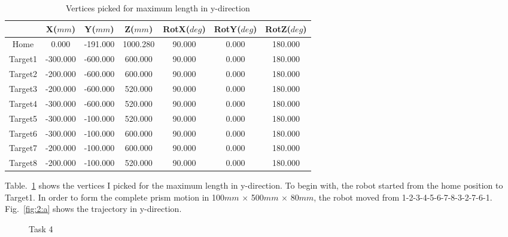 \documentclass[letterpaper,11pt]{texMemo} %
\begin{document}
\renewcommand\arraystretch{2}
\begin{table}[H]\footnotesize
\centering
\begin{tabular}{|c|c|c|c|c|c|c|}
\hline
 & \textbf{X($mm$)}&\textbf{Y($mm$)}&\textbf{Z($mm$)}& \textbf{RotX($deg$)} & \textbf{RotY($deg$)} & \textbf{RotZ($deg$)} \\
\hline
Home & 0.000 & -191.000 & 1000.280 & 90.000 & 0.000 & 180.000\\
\hline
Target1 & -300.000 & -600.000 & 600.000 & 90.000 & 0.000 & 180.000\\
\hline
Target2 & -200.000 & -600.000 & 600.000 & 90.000 & 0.000 & 180.000\\
\hline
Target3 & -200.000 & -600.000 & 520.000 & 90.000 & 0.000 & 180.000\\
\hline 
Target4 & -300.000 & -600.000 & 520.000 & 90.000 & 0.000 & 180.000\\
\hline
Target5  & -300.000 & -100.000 & 520.000 & 90.000 & 0.000 & 180.000\\
\hline
Target6  & -300.000 & -100.000 & 600.000 & 90.000 & 0.000 & 180.000\\
\hline
Target7  & -200.000 & -100.000 & 600.000 & 90.000 & 0.000 & 180.000\\
\hline
Target8  &-200.000 & -100.000 & 520.000 & 90.000 & 0.000 & 180.000\\
\hline
\end{tabular}
\caption{Vertices picked for maximum length in y-direction}
\label{table:1}
\end{table}

Table.~\ref{table:1} shows the vertices I picked for the maximum length in y-direction. To begin with, the robot started from the home position to Target1. In order to form the complete prism motion in 100$mm$ $\times$ 500$mm$ $\times$ 80$mm$, the robot moved from 1-2-3-4-5-6-7-8-3-2-7-6-1. Fig.~\ref{fig:2:a} shows the trajectory in y-direction.


\begin{figure}[H]
	\centering   
	\hspace{0.1in} 
	\caption{Task 4 } 
	\label{fig:2}
\end{figure}
\end{document}

